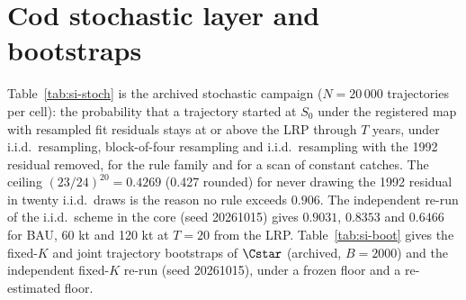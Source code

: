 \section{Cod stochastic layer and bootstraps}\label{si:cod-stoch}
Table~\ref{tab:si-stoch} is the archived stochastic campaign ($N=20\,000$ trajectories per cell): the probability that a trajectory started at $S_0$ under the registered map with resampled fit residuals stays at or above the LRP through $T$ years, under i.i.d.\ resampling, block-of-four resampling and i.i.d.\ resampling with the 1992 residual removed, for the rule family and for a scan of constant catches. The ceiling $(23/24)^{20}=0.4269$ (0.427 rounded) for never drawing the 1992 residual in twenty i.i.d.\ draws is the reason no rule exceeds $0.906$. The independent re-run of the i.i.d.\ scheme in the core (seed 20261015) gives $0.9031$, $0.8353$ and $0.6466$ for BAU, 60 kt and 120 kt at $T=20$ from the LRP. Table~\ref{tab:si-boot} gives the fixed-$K$ and joint trajectory bootstraps of $\Cstar$ (archived, $B=2000$) and the independent fixed-$K$ re-run (seed 20261015), under a frozen floor and a re-estimated floor.


